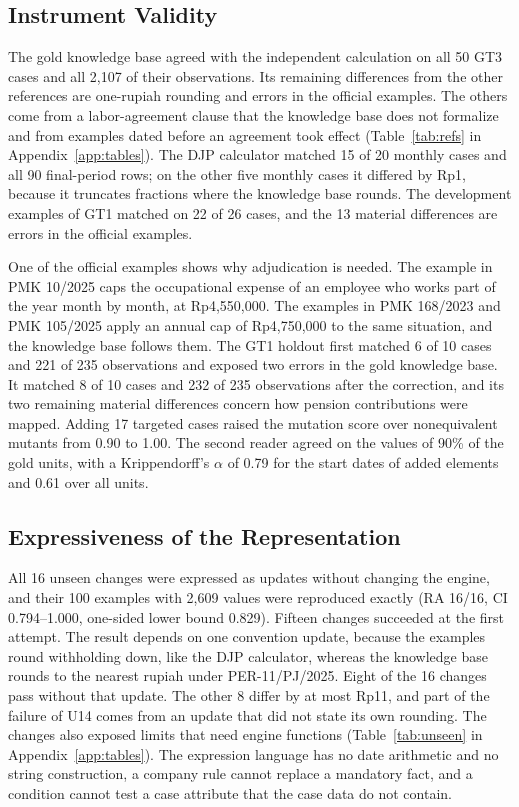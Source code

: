 \subsection{Instrument Validity}
\label{sec:res-instruments}
The gold knowledge base agreed with the independent calculation on all 50 GT3 cases and all 2,107 of their observations. Its remaining differences from the other references are one-rupiah rounding and errors in the official examples. The others come from a labor-agreement clause that the knowledge base does not formalize and from examples dated before an agreement took effect (Table~\ref{tab:refs} in Appendix~\ref{app:tables}). The DJP calculator matched 15 of 20 monthly cases and all 90 final-period rows; on the other five monthly cases it differed by Rp1, because it truncates fractions where the knowledge base rounds. The development examples of GT1 matched on 22 of 26 cases, and the 13 material differences are errors in the official examples.

One of the official examples shows why adjudication is needed. The example in PMK 10/2025 caps the occupational expense of an employee who works part of the year month by month, at Rp4,550,000. The examples in PMK 168/2023 and PMK 105/2025 apply an annual cap of Rp4,750,000 to the same situation, and the knowledge base follows them. The GT1 holdout first matched 6 of 10 cases and 221 of 235 observations and exposed two errors in the gold knowledge base. It matched 8 of 10 cases and 232 of 235 observations after the correction, and its two remaining material differences concern how pension contributions were mapped. Adding 17 targeted cases raised the mutation score over nonequivalent mutants from 0.90 to 1.00. The second reader agreed on the values of 90\% of the gold units, with a Krippendorff's $\alpha$ of 0.79 for the start dates of added elements and 0.61 over all units.

\subsection{Expressiveness of the Representation}
\label{sec:res-expressiveness}
All 16 unseen changes were expressed as updates without changing the engine, and their 100 examples with 2,609 values were reproduced exactly (RA 16/16, CI 0.794--1.000, one-sided lower bound 0.829). Fifteen changes succeeded at the first attempt. The result depends on one convention update, because the examples round withholding down, like the DJP calculator, whereas the knowledge base rounds to the nearest rupiah under PER-11/PJ/2025. Eight of the 16 changes pass without that update. The other 8 differ by at most Rp11, and part of the failure of U14 comes from an update that did not state its own rounding. The changes also exposed limits that need engine functions (Table~\ref{tab:unseen} in Appendix~\ref{app:tables}). The expression language has no date arithmetic and no string construction, a company rule cannot replace a mandatory fact, and a condition cannot test a case attribute that the case data do not contain.

